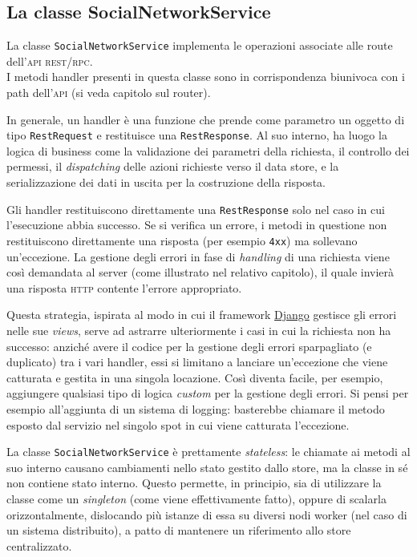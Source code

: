 \documentclass[a4paper,8pt]{article} %
\def\code#1{\texttt{#1}}
\begin{document}
\subsection{La classe SocialNetworkService}
La classe \code{SocialNetworkService} implementa le operazioni associate alle route dell'\textsc{api} \textsc{rest}/\textsc{rpc}.\\ I metodi handler presenti in questa classe
sono in corrispondenza biunivoca con i path dell'\textsc{api} (si veda capitolo sul router).

\par In generale, un handler è una funzione che prende come parametro un oggetto di tipo \code{RestRequest} e restituisce una \code{RestResponse}. Al suo interno,
ha luogo la logica di business come la validazione dei parametri della richiesta, il controllo dei permessi, il \emph{dispatching} delle azioni richieste verso il data store, e la
serializzazione dei dati in uscita per la costruzione della risposta.

\par Gli handler restituiscono direttamente una \code{RestResponse} solo nel caso in cui l'esecuzione abbia successo. Se si verifica un errore, i metodi in questione non restituiscono
direttamente una risposta (per esempio \code{4xx}) ma sollevano un'eccezione. La gestione degli errori in fase di \emph{handling} di una richiesta viene così demandata
al server (come illustrato nel relativo capitolo), il quale invierà una risposta \textsc{\textsc{http}} contente l'errore appropriato.
\par Questa strategia, ispirata al modo in cui il framework \href{https://www.djangoproject.com/}{Django} gestisce gli errori nelle sue \emph{views}, serve ad astrarre ulteriormente i casi in cui la richiesta non ha successo:
anziché avere il codice per la gestione degli errori sparpagliato (e duplicato) tra i vari handler, essi si limitano a lanciare un'eccezione che viene catturata e gestita in una singola locazione.
Così diventa
facile, per esempio, aggiungere qualsiasi tipo di logica \emph{custom} per la gestione degli errori. Si pensi per esempio all'aggiunta di un sistema di logging: basterebbe chiamare il metodo esposto dal servizio nel singolo spot in cui
viene catturata l'eccezione.

\par La classe \code{SocialNetworkService} è prettamente \emph{stateless}: le chiamate ai metodi al suo interno causano cambiamenti nello stato gestito dallo store, ma la classe
in sé non contiene stato interno. Questo permette, in principio, sia di utilizzare la classe come un \emph{singleton} (come viene effettivamente fatto), oppure di scalarla
orizzontalmente, dislocando più istanze di essa su diversi nodi worker (nel caso di un sistema distribuito), a patto di mantenere un riferimento allo store centralizzato.
\end{document}
